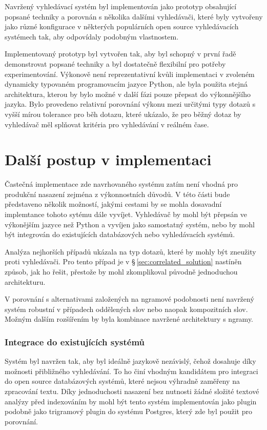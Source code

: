 \documentclass[11pt,letterpaper,oneside,openright]{book}
\begin{document}

Navržený vyhledávací systém byl implementován jako prototyp obsahující popsané
techniky a porovnán s několika dalšími vyhledávači, které byly vytvořeny jako
různé konfigurace v některých populárních open source vyhledávacích systémech
tak, aby odpovídaly podobným vlastnostem.

Implementovaný prototyp byl vytvořen tak, aby byl schopný v první řadě
demonstrovat popsané techniky a byl dostatečně flexibilní pro potřeby
experimentování. Výkonově není reprezentativní kvůli implementaci v zvoleném
dynamicky typovaném programovacím jazyce Python, ale byla použita stejná
architektura, kterou by bylo možné v další fázi pouze přepsat do výkonnějšího
jazyka. Bylo provedeno relativní porovnání výkonu mezi určitými typy dotazů s
vyšší mírou tolerance pro běh dotazu, které ukázalo, že pro běžný dotaz by
vyhledávač měl splňovat kritéria pro vyhledávání v reálném čase.

\section{Další postup v implementaci}
Častečná implementace zde navrhovaného systému zatím není vhodná pro produkční
nasazení zejména z výkonnostních důvodů. V této části bude představeno několik
možností, jakými cestami by se mohla dosavadní implemtance tohoto sytému dále
vyvíjet. Vyhledávač by mohl být přepsán ve výkonějším jazyce než Python a
vyvíjen jako samostatný systém, nebo by mohl být integrován do existujících
databázových nebo vyhledávacích systémů.

Analýza nejhorších případů ukázala na typ dotazů, které by mohly být zneužity
proti vyhledávači. Pro tento případ je v \S\,\ref{sec:correlated_solution}
nastíněn způsob, jak ho řešit, přestože by mohl zkomplikoval původně
jednoduchou architekturu.

V porovnání s alternativami založených na ngramové podobnosti není navržený
systém robustní v případech oddělených slov nebo naopak kompozitních slov.
Možným dalším rozšířením by byla kombinace navržené architektury s ngramy.

\subsubsection{Integrace do existujících systémů}
Systém byl navržen tak, aby byl ideálně jazykově nezávislý, čehož dosahuje díky
možnosti přibližného vyhledávání. To ho činí vhodným kandidátem pro integraci
do open source databázových systémů, které nejsou výhradně zaměřeny na
zpracování textu. Díky jednoduchosti nasazení bez nutnosti žádné složité
textové analýzy před indexováním by mohl být tento systém implementován
jako plugin podobně jako trigramový plugin do systému Postgres, který zde
byl použit pro porovnání.
\end{document}
